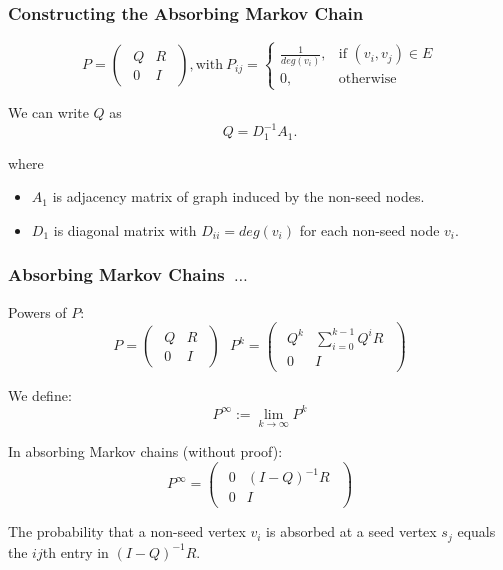 \documentclass[xcolor=table]{beamer}
\def\vsp{\vspace{\baselineskip}}
\begin{document}
\begin{frame}[t]
\frametitle{Constructing the Absorbing Markov Chain}
$$
	P =
      \begin{pmatrix}
	  \begin{array}{c|c}
        Q & R\\ \hline
        0 & I
	  \end{array}
      \end{pmatrix}
      ,\text{with}~
    P_{ij} =\begin{cases}
        \frac{1}{deg(v_i)}, & \text{if $(v_i,v_j) \in E$} \\
        0, & \text{otherwise}
        \end{cases}
    $$

    \vsp
    \vsp

    
    We can write $Q$ as 
    $$Q = D_1^{-1}A_1.$$

    where
    \begin{itemize}
        \item $A_1$ is adjacency matrix of graph induced by the non-seed nodes.
        \item $D_1$ is diagonal matrix with $D_{ii} = deg(v_i)$ for each non-seed node $v_i$.

    \end{itemize}
\end{frame}

\begin{frame}[t]
\frametitle{Absorbing Markov Chains~$\ldots$}
Powers of $P$:
    \[
    P =
    \begin{pmatrix}
	\begin{array}{c|c}
        Q & R \\ \hline
        0 & I
	\end{array}
    \end{pmatrix}
    ~~~
    P^k =
    \begin{pmatrix}
	\begin{array}{c|c}
        Q^k & \sum\limits_{i=0}^{k-1} Q^{i} R \\ \hline
        0   & I
	\end{array}
      \end{pmatrix}
    \]

    {
    We define:
    $$P^\infty := \lim \limits_{k \rightarrow \infty}{P^k}$$
    }

    {
    In absorbing Markov chains (without proof):
    $$
        P^\infty=
        \begin{pmatrix}
		\begin{array}{c|c}
            0 & (I-Q)^{-1}R \\ \hline
            0 & I
		\end{array}
          \end{pmatrix}
    $$
    }

    {
    The probability that a non-seed vertex $v_i$ is 
	absorbed at a seed vertex $s_j$ equals the $ij$th entry 
	in $(I-Q)^{-1}R$.
    }
\end{frame}
\end{document}
